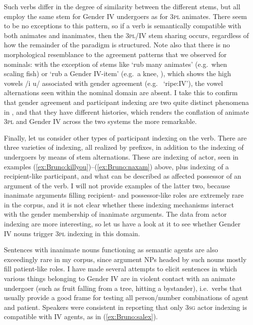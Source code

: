\documentclass[output=collectionpaper]{langsci/langscibook}
\begin{document}
Such verbs differ in the degree of similarity between the different stems, but all employ the same stem for Gender IV undergoers as for 3\textsc{pl} animates. There seem to be no exceptions to this pattern, so if a verb is semantically compatible with both animates and inanimates, then the 3\textsc{pl}/IV stem sharing occurs, regardless of how the remainder of the paradigm is structured. Note also that there is no morphological resemblance to the agreement patterns that we observed for nominals: with the exception of stems like  `rub many animates' (e.g.\ when scaling fish) or `rub a Gender IV-item' (e.g.\ a knee, ), which shows the high vowels /i u/ associated with gender agreement (e.g.\  `ripe:IV'), the vowel alternations seen within the nominal domain are absent. I take this to confirm that gender agreement and participant indexing are two quite distinct phenomena in , and that they have different histories, which renders the conflation of animate 3\textsc{pl} and Gender IV across the two systems the more remarkable.

Finally, let us consider other types of participant indexing on the verb. There are three varieties of indexing, all realized by prefixes, in addition to the indexing of undergoers by means of stem alternations. These are indexing of actor, seen in examples (\ref{ex:Bruno:killyou})--(\ref{ex:Bruno:naxam}) above, plus indexing of a recipient-like participant, and what can be described as affected possessor of an argument of the verb. I will not provide examples of the latter two, because inanimate arguments filling  recipient- and possessor-like roles are extremely rare in the corpus, and it is not clear whether these indexing mechanisms interact with the gender membership of inanimate arguments. The data from actor indexing are more interesting, so let us have a look at it to see whether Gender IV nouns trigger 3\textsc{pl} indexing in this domain.

Sentences with inanimate nouns functioning as semantic agents are also exceedingly rare in my corpus, since argument NPs headed by such nouns mostly fill patient-like roles. I have made several attempts to elicit sentences in which various things belonging to Gender IV are in violent contact with an animate undergoer (such as fruit falling from a tree, hitting a bystander), i.e.\ verbs that usually provide a good frame for testing all person/number combinations of agent and patient. Speakers were consistent in reporting that only 3\textsc{sg} actor indexing is compatible with IV agents, as in (\ref{ex:Bruno:salex}).
\end{document}
